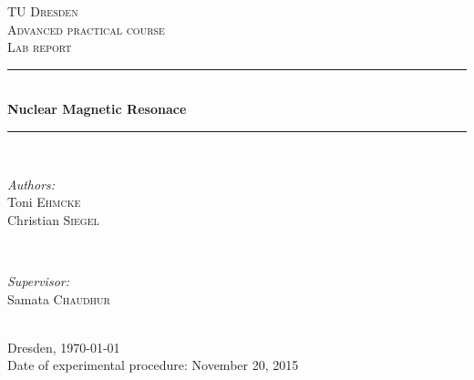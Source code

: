 \begin{titlepage}
\newcommand{\HRule}{\rule{\linewidth}{0.5mm}} %

\center %
 

\textsc{\LARGE TU Dresden}\\[1.5cm] %
\textsc{\Large Advanced practical course}\\[0.5cm] %
\textsc{\Large Lab report}\\[0.5cm] %


\HRule \\[0.7cm]
{ \huge \bfseries Nuclear Magnetic Resonace}\\[0.4cm] %
\HRule \\[1.5cm]
 

\begin{minipage}{0.4\textwidth}
\begin{flushleft} \large
\emph{Authors:}\\
Toni \textsc{Ehmcke}\\
Christian \textsc{Siegel}
\end{flushleft}
\end{minipage}
~
\begin{minipage}{0.4\textwidth}
\begin{flushright} \large
\emph{Supervisor:} \\
Samata \textsc{Chaudhur} %
\end{flushright}
\end{minipage}\\[4cm]


{\large Dresden, \today}\\ %
{\large Date of experimental procedure: November 20, 2015}\\[3cm]


\vfill 

\end{titlepage}
